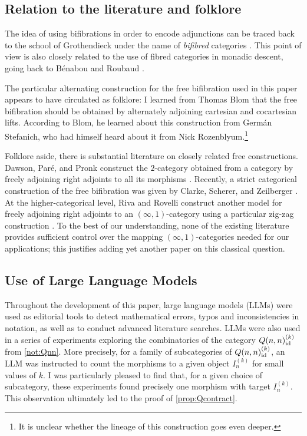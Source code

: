 \documentclass[a4paper,reqno,twoside]{amsart}
\begin{document}
\subsection*{Relation to the literature and folklore}
The idea of using bifibrations in order to encode adjunctions can be traced back to the school of Grothendieck under the name of \emph{bifibred} categories \cite[Exposé~VI, \S~10]{Grothendieck1971SGA1}. This point of view is also closely related to the use of fibred categories in monadic descent, going back to Bénabou and Roubaud \cite{BenabouRoubaud1970MonadesDescente}.

The particular alternating construction for the free bifibration used in this paper appears to have circulated as folklore: I learned from Thomas Blom that the free bifibration should be obtained by alternately adjoining cartesian and cocartesian lifts. According to Blom, he learned about this construction from Germán Stefanich, who had himself heard about it from Nick Rozenblyum.\footnote{It is unclear whether the lineage of this construction goes even deeper.}

Folklore aside, there is substantial literature on closely related free constructions. Dawson, Paré, and Pronk construct the $2$-category obtained from a category by freely adjoining right adjoints to all its morphisms \cite{DawsonParePronk2003AdjoiningAdjoints}. Recently, a strict categorical construction of the free bifibration was given by Clarke, Scherer, and Zeilberger \cite{ClarkeSchererZeilberger2025FreeBifibration}. At the higher-categorical level, Riva and Rovelli construct another model for freely adjoining right adjoints to an $(\infty,1)$-category using a particular zig-zag construction \cite{RivaRovelli2025ZigzagsAdjunctions}. To the best of our understanding, none of the existing literature provides sufficient control over the mapping $(\infty,1)$-categories needed for our applications; this justifies adding yet another paper on this classical question.
\subsection*{Use of Large Language Models}
Throughout the development of this paper, large language models (LLMs) were used as editorial tools to detect mathematical errors, typos and inconsistencies in notation, as well as to conduct advanced literature searches. LLMs were also used in a series of experiments exploring the combinatorics of the category $Q(n,n)_{\mathrm{id}}^{(k)}$ from \cref{not:Qnn}. More precisely, for a family of subcategories of $Q(n,n)_{\mathrm{id}}^{(k)}$, an LLM was instructed to count the morphisms to a given object $I_n^{(k)}$ for small values of $k$. I was particularly pleased to find that, for a given choice of subcategory, these experiments found precisely one morphism with target $I_n^{(k)}$. This observation ultimately led to the proof of \cref{prop:Qcontract}.
\end{document}
